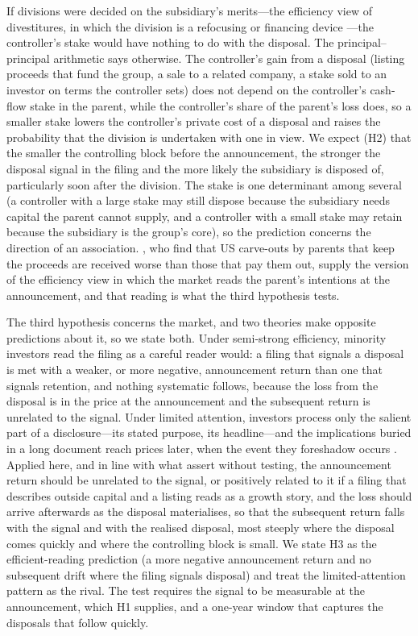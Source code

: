 If divisions were decided on the subsidiary's merits---the efficiency view of divestitures, in which the division is a refocusing or financing device \cite{krishnaswami1999, slovin1995, powers2003, vijh2002}---the controller's stake would have nothing to do with the disposal. The principal--principal arithmetic says otherwise. The controller's gain from a disposal (listing proceeds that fund the group, a sale to a related company, a stake sold to an investor on terms the controller sets) does not depend on the controller's cash-flow stake in the parent, while the controller's share of the parent's loss does, so a smaller stake lowers the controller's private cost of a disposal and raises the probability that the division is undertaken with one in view. We expect (H2) that the smaller the controlling block before the announcement, the stronger the disposal signal in the filing and the more likely the subsidiary is disposed of, particularly soon after the division. The stake is one determinant among several (a controller with a large stake may still dispose because the subsidiary needs capital the parent cannot supply, and a controller with a small stake may retain because the subsidiary is the group's core), so the prediction concerns the direction of an association. , who find that US carve-outs by parents that keep the proceeds are received worse than those that pay them out, supply the version of the efficiency view in which the market reads the parent's intentions at the announcement, and that reading is what the third hypothesis tests.

The third hypothesis concerns the market, and two theories make opposite predictions about it, so we state both. Under semi-strong efficiency, minority investors read the filing as a careful reader would: a filing that signals a disposal is met with a weaker, or more negative, announcement return than one that signals retention, and nothing systematic follows, because the loss from the disposal is in the price at the announcement and the subsequent return is unrelated to the signal. Under limited attention, investors process only the salient part of a disclosure---its stated purpose, its headline---and the implications buried in a long document reach prices later, when the event they foreshadow occurs \cite{hirshleifer2003, dellavigna2009}. Applied here, and in line with what  assert without testing, the announcement return should be unrelated to the signal, or positively related to it if a filing that describes outside capital and a listing reads as a growth story, and the loss should arrive afterwards as the disposal materialises, so that the subsequent return falls with the signal and with the realised disposal, most steeply where the disposal comes quickly and where the controlling block is small. We state H3 as the efficient-reading prediction (a more negative announcement return and no subsequent drift where the filing signals disposal) and treat the limited-attention pattern as the rival. The test requires the signal to be measurable at the announcement, which H1 supplies, and a one-year window that captures the disposals that follow quickly.

